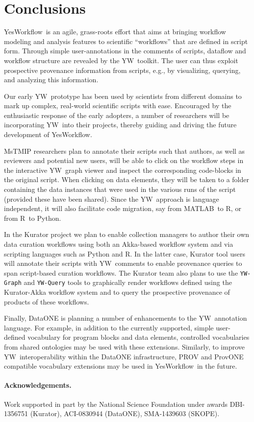 \documentclass{article}
\newcommand{\YW}{\textsf{YesWorkflow}}
\newcommand{\yw}{\textsf{YW}}
\newcommand{\ywm}[1]{\texttt{#1}}
\newcommand{\R}{\textsf{R}}
\newcommand{\MATLAB}{\textsf{MATLAB}}
\begin{document}
\section{Conclusions}

\YW\ is an agile, grass-roots effort that aims at bringing workflow
modeling and analysis features to scientific ``workflows'' that are
defined in script form. Through simple user-annotations in the
comments of scripts, dataflow and workflow structure are revealed by
the \yw\ toolkit. The user can thus exploit prospective 
provenance information from scripts, e.g., by
visualizing, querying, and analyzing this information.

Our early \yw\ prototype \cite{YWgithub2015} has been used by
scientists from different domains to mark up complex, real-world
scientific scripts with ease. Encouraged by the enthusiastic response
of the early adopters, a number of researchers will be incorporating
\yw\ into their projects, thereby guiding and driving the future
development of \YW.

MsTMIP researchers plan to annotate their scripts such that authors,
as well as reviewers and potential new users, will be able to click on
the workflow steps in the interactive \yw\ graph viewer and inspect
the corresponding code-blocks in the original script. When clicking on
data elements, they will be taken to a folder containing the data
instances that were used in the various runs of the script (provided
these have been shared). Since the \yw\ approach is language
independent, it will also facilitate code migration, say from \MATLAB\
to \R, or from \R\ to Python.

In the Kurator project \cite{kuratorproject} we plan to enable
collection managers to author their own data curation workflows using
both an Akka-based workflow system and via scripting languages such as
Python and \R. In the latter case, Kurator tool users will annotate
their scripts with \yw\ comments to enable provenance queries to span
script-based curation workflows.
The Kurator team also plans to use the \ywm{YW-Graph} and
\ywm{YW-Query} tools to graphically render workflows defined using the
Kurator-Akka workflow system and to query the prospective provenance
of products of these workflows.

Finally, DataONE is planning a number of enhancements to the \yw\
annotation language. For example, in addition to the currently
supported, simple user-defined vocabulary for program blocks and data
elements, controlled vocabularies from shared ontologies may be used
with these extensions. Similarly, to improve \yw\ interoperability
within the DataONE infrastructure, PROV \cite{moreau2013prov} and
ProvONE \cite{dataone2014provone} compatible vocabulary extensions
may be used in \YW\ in the future.

\paragraph{Acknowledgements.}
Work supported in part by the National Science Foundation under awards
DBI-1356751 (Kurator), ACI-0830944 (DataONE), SMA-1439603 (SKOPE).

\small



\end{document}
